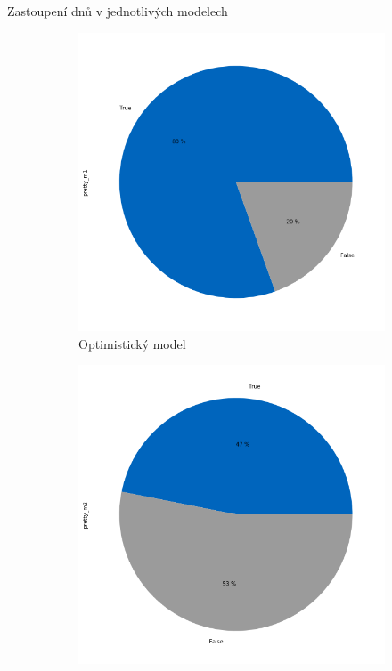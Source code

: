 \documentclass[10pt]{beamer}
\begin{document}
\begin{frame}{Zastoupení  dnů v jednotlivých modelech}
    \begin{figure}
\begin{subfigure}{.33\textwidth}
  \centering
  \includegraphics[width=\linewidth]{m1_pie.png}
  \caption{Optimistický model}
  \label{fig:sfig1}
\end{subfigure}%
\begin{subfigure}{.33\textwidth}
  \centering
  \includegraphics[width=\linewidth]{m2_pie.png}

\end{subfigure}
\end{figure}
\end{frame}
\end{document}
